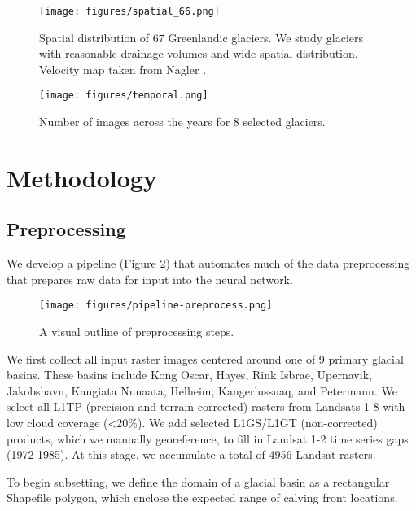 \documentclass[tc, manuscript]{copernicus}
\begin{document}
\begin{figure}[h]
    \centering
    \begin{minipage}{10.5cm}
        \centering
        \texttt{[image: figures/spatial\_66.png]}
        \caption{Spatial distribution of 67 Greenlandic glaciers. We study glaciers with reasonable drainage volumes and wide spatial distribution. Velocity map taken from Nagler \citep{nagler2015}.}
        \label{fig:spatial_coverage}
    \end{minipage}
    \hspace{0.5cm}
    \begin{minipage}{6cm}
        \texttt{[image: figures/temporal.png]}
        \caption{Number of images across the years for 8 selected glaciers.}
        \label{fig:temporal_coverage}
    \end{minipage}
\end{figure}

\section{Methodology}
\label{sec:method}
\subsection{Preprocessing}
\label{sec:preproc}
We develop a pipeline (Figure \ref{fig:preprocess}) that automates much of the data preprocessing that prepares raw data for input into the neural network.

\begin{figure}[h]
    \texttt{[image: figures/pipeline-preprocess.png]}
    \centering
    \caption{A visual outline of preprocessing steps.}
    \label{fig:preprocess}
\end{figure}

We first collect all input raster images centered around one of 9 primary glacial basins. These basins include Kong Oscar, Hayes, Rink Isbrae, Upernavik, Jakobshavn, Kangiata Nunaata, Helheim, Kangerlussuaq, and Petermann. We select all L1TP (precision and terrain corrected) rasters from Landsats 1-8 with low cloud coverage (\textless20\%). We add selected L1GS/L1GT (non-corrected) products, which we manually georeference, to fill in Landsat 1-2 time series gaps (1972-1985). At this stage, we accumulate a total of 4956 Landsat rasters.

To begin subsetting, we define the domain of a glacial basin as a rectangular Shapefile polygon, which enclose the expected  range of calving front locations.
\end{document}
